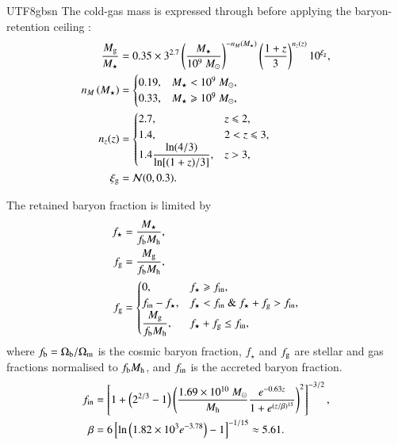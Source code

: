 \documentclass[trackchanges, twocolappendix, twocolumn]{aastex701}
\begin{document}
\begin{CJK*}{UTF8}{gbsn}
The cold-gas mass is expressed through before applying the baryon-retention ceiling \citep{Choksi+2018GC, Chen&Gnedin2023GC}:
\begin{align}
\dfrac{M_{\rm g}}{M_\star} & =
0.35 \times 3^{2.7} \left( \dfrac{M_\star}{10^9~M_\odot} \right)^{-n_M \left( M_\star \right)} \left( \dfrac{1 + z}{3} \right)^{n_z (z)} 10^{\xi_{\rm g}} , \\
n_M \left( M_\star \right) & = \begin{cases}
0.19, & M_\star < 10^9~M_\odot, \\
0.33, & M_\star \geqslant 10^9~M_\odot, \end{cases} \\
n_z (z) & = \begin{cases}
2.7, & z \leqslant 2, \\
1.4, & 2 < z \leqslant 3, \\
1.4 \dfrac{\ln (4 / 3)}{\ln [(1 + z) / 3]}, & z > 3 ,
\end{cases}\\
\xi_{\rm g} & = {\cal N} (0, 0.3) .
\end{align}

The retained baryon fraction is limited by \citep{Muratov&Gnedin2010GC, Chen&Gnedin2023GC}
\begin{align}
f_{\star} & = \dfrac{M_{\star}}{f_{\rm b} M_{\rm h}} , \\
f_{\rm g} & = \dfrac{M_{\rm g}}{f_{\rm b} M_{\rm h}} , \\
f_{\rm g} & = \begin{cases}
0, & f_{\star} \geqslant f_{\rm in} , \\
f_{\rm in} - f_{\star}, & f_{\star} < f_{\rm in} ~\&~ f_{\star} + f_{\rm g} > f_{\rm in} , \\
\dfrac{M_{\rm g}}{f_{\rm b} M_{\rm h}}, & f_{\star} + f_{\rm g} \leq f_{\rm in},
\end{cases}
\end{align}
where $f_{\rm b} = \Omega_{\rm b} / \Omega_{\rm m}$ is the cosmic baryon fraction, $f_{\star}$ and $f_{\rm g}$ are stellar and gas fractions normalised to $f_{\rm b}M_{\rm h}$, and $f_{\rm in}$ is the accreted baryon fraction.
\begin{align}
f_{\rm in} & = \left[ 1 + \left( 2^{2/3} - 1 \right) \left( \dfrac{1.69 \times 10^{10}~M_\odot}
{M_{\rm h}} \dfrac{e^{-0.63 z}}
{1 + e^{(z / \beta)^{15}}} \right)^2 \right]^{-3/2}, \\
\beta & = 6 \left[ \ln \left( 1.82 \times 10^3 e^{-3.78} \right) - 1 \right]^{- 1 / 15} \approx 5.61.
\end{align}


\end{CJK*}
\end{document}

